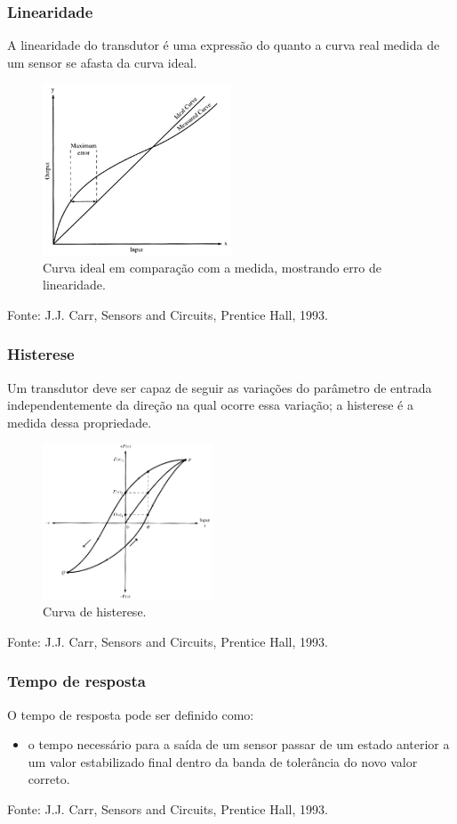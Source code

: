 \documentclass{beamer}
\begin{document}
\begin{frame}
	\frametitle{Linearidade}
	A linearidade do transdutor é uma expressão do quanto a curva real medida de um sensor se afasta da curva ideal. 
	\begin{figure}
		\includegraphics[width=0.5\textwidth]{linearidade}
		\caption{Curva ideal em comparação com a medida, mostrando erro de linearidade.}
	\end{figure} 
	{\scriptsize Fonte: J.J. Carr, Sensors and Circuits, Prentice Hall, 1993.}
\end{frame}


\begin{frame}
	\frametitle{Histerese}
	Um transdutor deve ser capaz de seguir as variações do parâmetro de entrada independentemente da direção na qual ocorre essa variação; a histerese é a medida dessa propriedade. 	
	\begin{figure}
		\includegraphics[width=0.45\textwidth]{histerese}
		\caption{Curva de histerese.}
	\end{figure} 
	{\scriptsize Fonte: J.J. Carr, Sensors and Circuits, Prentice Hall, 1993.}
\end{frame}

\begin{frame}
	\frametitle{Tempo de resposta}
	O tempo de resposta pode ser definido como:
	\begin{itemize}
		\item o tempo necessário para a saída de um sensor passar de um estado anterior a um valor estabilizado final dentro da banda de tolerância do novo valor correto.
	\end{itemize}
	{\scriptsize Fonte: J.J. Carr, Sensors and Circuits, Prentice Hall, 1993.}
\end{frame}
\end{document}
